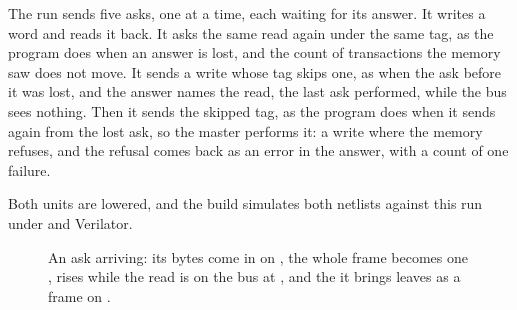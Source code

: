 The run sends five asks, one at a time, each waiting for its answer.
It writes a word and reads it back. It asks the same read again under
the same tag, as the program does when an answer is lost, and the
count of transactions the memory saw does not move. It sends a write
whose tag skips one, as when the ask before it was lost, and the
answer names the read, the last ask performed, while the bus sees
nothing. Then it sends the skipped tag, as the program does when it
sends again from the lost ask, so the master performs it: a write
where the memory refuses, and the refusal
comes back as an error in the answer, with a count of one failure.

Both units are lowered, and the build simulates both netlists against
this run under  and Verilator.

\begin{figure}[htbp]
\centering

\caption{An ask arriving: its bytes come in on , the whole
frame becomes one ,  rises while the read is on
the bus at , and the  it brings leaves as a frame
on .}
\label{fig:x-hostlink}
\end{figure}




